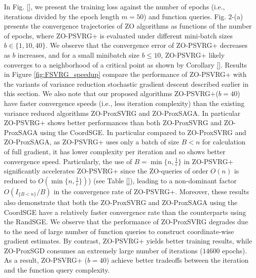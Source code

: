 \documentclass{article}
\theoremstyle{definition}
\theoremstyle{remark}
\begin{document}
{\color{Brown}
In Fig. \ref{}, we present the training loss against the number of epochs (i.e., iterations divided by the
epoch length $m = 50$) and function queries. 
{\color{Brown}
Fig. 2-(a) presents the
convergence trajectories of ZO algorithms as functions of the number of epochs, where ZO-PSVRG+ is evaluated under different mini-batch sizes {\color{red} $b \in \{1, 10, 40\}$}. We observe that the convergence
error of ZO-PSVRG+ decreases as $b$ increases, and for a small minibatch size $b \leq 10$, ZO-PSVRG+
likely converges to a neighborhood of a critical point as shown by Corollary \ref{}. 
}
}
Results in Figure \eqref{fig:FSVRG_speedup} compare the performance of ZO-PSVRG+ with the variants of variance reduction stochastic gradient descent described earlier in this section.  
{\color{Brown}
We also note that
our proposed algorithms ZO-PSVRG+($b = 40$) have faster
convergence speeds (i.e., less iteration complexity) than the existing variance reduced algorithms ZO-ProxSVRG and ZO-ProxSAGA.
}
{\color{Green}
In particular ZO-PSVRG+ shows better performances than both {\color{red} ZO-ProxSVRG and ZO-ProxSAGA
using the CoordSGE}. }
In particular compared to ZO-ProxSVRG and ZO-ProxSAGA, as ZO-PSVRG+ uses only a batch of size $B < n$ for calculation of full gradient, it has lower complexity per iteration and so shows better convergence speed.
{\color{Brown}
Particularly, the use of $B = \min\{n, \frac{1}{\epsilon}\}$ in ZO-PSVRG+ significantly
accelerates ZO-PSVRG+ since the ZO-queries of order $O(n)$ is reduced to $O(\min\{n, \frac{1}{\epsilon}\})$) (see Table \ref{}), leading
to a non-dominant factor $O(I_{\{B < n\}}/B)$ in the convergence rate of ZO-PSVRG+.}
{\color{Green}
 Moreover, these results also demonstrate that both the ZO-ProxSVRG and
ZO-ProxSAGA using the CoordSGE have a relatively faster
convergence rate than the counterparts using the RandSGE.
} {\color{red} We observe that the performance of ZO-ProxSVRG degrades due to the need of large number of function queries to construct
coordinate-wise gradient estimates. By contrast, ZO-PSVRG+ yields better training results, while
ZO-ProxSGD consumes an extremely large number of iterations ($14600$ epochs). As a result, ZO-PSVRG+
($b = 40$) achieve better tradeoffs between the iteration and the function query complexity.}
\end{document}
